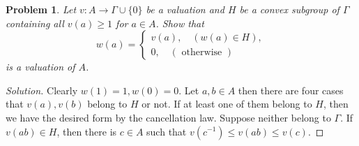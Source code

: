 \documentclass[8pt]{article}
\numberwithin{equation}{section}
\newenvironment{solution}{\begin{proof}[Solution]}{\end{proof}}
\newtheorem{problem}{Problem}[section]
\newcommand{\otherwise}[0]{\text{ otherwise }}
\begin{document}
\begin{problem}
  Let $v:A\to\Gamma\cup\{0\}$ be a valuation and $H$ be a convex subgroup of $\Gamma$ containing all $v(a)\geq 1$ for $a\in A$. Show that 
  \begin{equation*}
    w(a) = \begin{cases}
      v(a),\quad(w(a)\in H),\\
      0,\quad(\otherwise)
    \end{cases}
  \end{equation*}
  is a valuation of $A$.
\end{problem}
\begin{solution}
  Clearly $w(1) = 1,w(0) = 0$. Let $a,b\in A$ then there are four cases that $v(a),v(b)$ belong to $H$ or not. If at least one of them belong to $H$, then we have the desired form by the cancellation law. Suppose neither belong to $\Gamma$. If $v(ab)\in H$, then there is $c\in A$ such that $v(c^{-1})\leq v(ab)\leq v(c)$. 
\end{solution}
\end{document}
